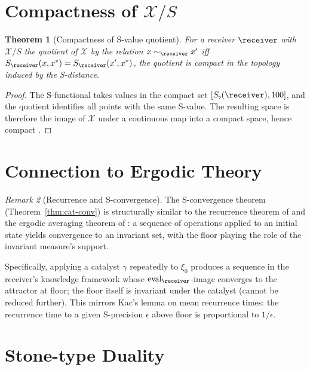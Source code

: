 \documentclass[11pt,a4paper]{article}
\theoremstyle{thmstyle}
\newtheorem{theorem}{Theorem}[section]
\theoremstyle{thmstyle}
\theoremstyle{definition}
\theoremstyle{remark}
\newtheorem{remark}[theorem]{Remark}
\DeclareMathOperator{\eval}{eval}
\newcommand{\Cands}{\mathcal{X}}
\newcommand{\Sscalar}{S}
\newcommand{\Sfloor}{S_{\flat}}
\begin{document}
\section{Compactness of $\Cands / \Sscalar$}
\label{sec:compactness-quotient}

\begin{theorem}[Compactness of S-value quotient]
\label{thm:compactness}
For a receiver $\receiver$ with $\Cands / \Sscalar$
the quotient of $\Cands$ by the relation
$x \sim_{\receiver} x'$ iff
$\Sscalar_{\receiver}(x, x^{*}) =
\Sscalar_{\receiver}(x', x^{*})$, the quotient is
compact in the topology induced by the S-distance.
\end{theorem}

\begin{proof}
The S-functional takes values in the compact set
$[\Sfloor(\receiver), 100]$, and the quotient
identifies all points with the same S-value.  The
resulting space is therefore the image of $\Cands$
under a continuous map into a compact space, hence
compact \citep{kelley1955,kuratowski1966}.
\end{proof}

\section{Connection to Ergodic Theory}
\label{sec:ergodic-connection}

\begin{remark}[Recurrence and S-convergence]
\label{rem:recurrence-conv}
The S-convergence theorem
(Theorem~\ref{thm:cat-conv}) is structurally
similar to the recurrence theorem of
\citet{poincare1890} and the ergodic averaging
theorem of \citet{birkhoff1931}: a sequence
of operations applied to an initial state
yields convergence to an invariant set, with the
floor playing the role of the invariant measure's
support.

Specifically, applying a catalyst $\gamma$
repeatedly to $\xi_{0}$ produces a sequence in
the receiver's knowledge framework whose
$\eval_{\receiver}$-image converges to the
attractor at floor; the floor itself is invariant
under the catalyst (cannot be reduced further).
This mirrors Kac's lemma \citep{kac1947} on
mean recurrence times: the recurrence time to a
given S-precision $\epsilon$ above floor is
proportional to $1/\epsilon$.
\end{remark}

\section{Stone-type Duality}
\label{sec:stone-duality}
\end{document}
